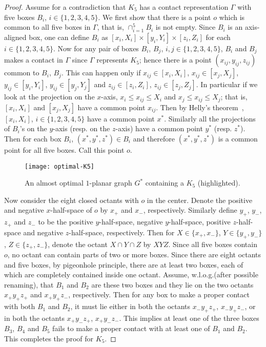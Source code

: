 \documentclass{article}
\newcommand{\WLOG}{w.l.o.g.\xspace}
\begin{document}
\begin{proof}
Assume for a contradiction that $K_5$ has a contact representation
 $\Gamma$ with five boxes $B_i$, $i\in\{1,2,3,4,5\}$. We first show that there is a point
 $o$ which is common to all five boxes in $\Gamma$, that is, $\cap_{i=1}^{5}B_i$ is not empty.
 Since $B_i$ is an axis-aligned box, one can define $B_i$ as
 $[x_i,X_i]\times[y_i,Y_i]\times[z_i,Z_i]$ for each $i\in\{1,2,3,4,5\}$.
 Now for any pair of boxes $B_i$, $B_j$, $i,j\in\{1,2,3,4,5\}$, $B_i$ and $B_j$ makes a
 contact in $\Gamma$ since $\Gamma$ represents $K_5$; hence there is a point $(x_{ij}, y_{ij},
 z_{ij})$ common to $B_i$, $B_j$. This can happen only if $x_{ij}\in[x_i,X_i]$, $x_{ij}\in[x_j,X_j]$,
 $y_{ij}\in[y_i,Y_i]$, $y_{ij}\in[y_j,Y_j]$ and $z_{ij}\in[z_i,Z_i]$, $z_{ij}\in[z_j,Z_j]$. In particular
 if we look at the projection on the $x$-axis, $x_i\le x_{ij}\le X_i$ and $x_j\le x_{ij}\le X_j$;
 that is, $[x_i,X_i]$ and $[x_j,X_j]$ have a common point $x_{ij}$. Then by Helly's
 theorem~\cite{AH95}, $[x_i,X_i]$, $i\in\{1,2,3,4,5\}$ have a common
 point $x^*$. Similarly all the projections of $B_i$'s on the $y$-axis (resp. on the $z$-axis)
 have a common point $y^*$ (resp. $z^*$). Then for each box $B_i$, $(x^*,y^*,z^*)\in B_i$
 and therefore $(x^*,y^*,z^*)$ is a common point for all five boxes. Call this point $o$.

\begin{figure}[b!]
\centering
\texttt{[image: optimal-K5]}
\caption{An almost optimal $1$-planar graph $G^*$ containing a $K_5$ (highlighted).}
\label{fig:K5}
\end{figure}

Now consider the eight closed octants with $o$ in the center.
Denote the positive and negative $x$-half-space of $o$ by $x_{+}$ and $x_{-}$,
 respectively. Similarly define $y_{+}$, $y_{-}$, $z_{+}$ and $z_{-}$ to be the positive
 $y$-half-space, negative $y$-half-space, positive  $z$-half-space and negative $z$-half-space,
 respectively. Then for $X\in\{x_{+}, x_{-}\}$, $Y\in\{y_{+}, y_{-}\}$, $Z\in\{z_{+}, z_{-}\}$,
 denote the octant $X\cap Y\cap Z$ by $XYZ$. Since all five boxes contain $o$, no octant
 can contain parts of two or more boxes. Since there are eight octants and five boxes,
 by pigeonhole principle, there are at least two boxes, each of which are completely contained
 inside one octant. Assume, \WLOG (after possible renaming), that $B_1$ and
 $B_2$ are these two boxes and they lie on the two octants $x_{+}y_{+}z_{+}$ and
 $x_{+}y_{+}z_{-}$, respectively. Then for any box to make a proper contact with both $B_1$
 and $B_2$, it must lie either in both the octants $x_{-}y_{+}z_{+}$, $x_{-}y_{+}z_{-}$, or in
 both the octants $x_{+}y_{-}z_{+}$, $x_{+}y_{-}z_{-}$. This implies at least one of the three
 boxes $B_3$, $B_4$ and $B_5$ fails to make a proper contact with at least one of $B_1$
 and $B_2$. This completes the proof for $K_5$.


\end{proof}
\end{document}
